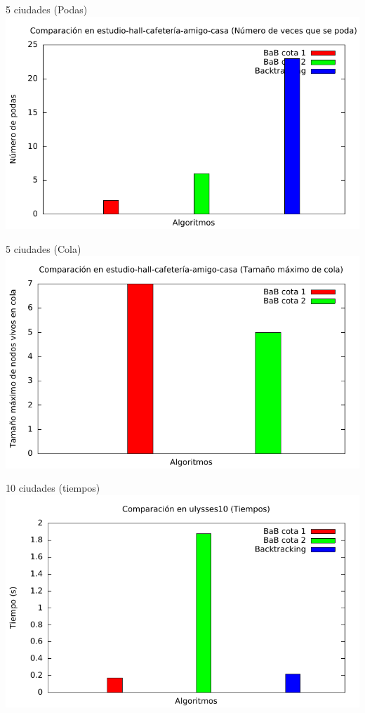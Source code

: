 \begin{frame}{5 ciudades (Podas)}
\includegraphics[width=\textwidth]{img/barras_e-h-c-a-c5_poda}
\end{frame}

\begin{frame}{5 ciudades (Cola)}
\includegraphics[width=\textwidth]{img/barras_e-h-c-a-c5_cola}
\end{frame}

\begin{frame}{10 ciudades (tiempos)}
\includegraphics[width=\textwidth]{img/barras_ulysses10_t}
\end{frame}

